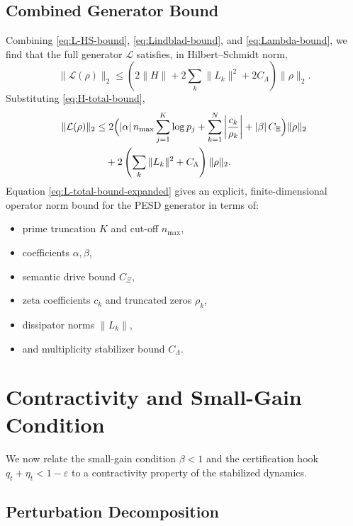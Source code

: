 \documentclass[11pt]{article}
\begin{document}
\subsection{Combined Generator Bound}

Combining \eqref{eq:L-HS-bound}, \eqref{eq:Lindblad-bound}, and \eqref{eq:Lambda-bound}, we find that the full generator \(\mathcal{L}\) satisfies, in Hilbert--Schmidt norm,
\begin{equation}
  \|\mathcal{L}(\rho)\|_2
  \le \left( 2\|H\|
           + 2\sum_k \|L_k\|^2
           + 2C_{\Lambda}
      \right)\|\rho\|_2.   \label{eq:L-total-bound}
\end{equation}
Substituting \eqref{eq:H-total-bound},
\begin{align}
  \|\mathcal{L}(\rho)\|_2
  &\le
    2\Bigl(
       |\alpha|\,n_{\max}\sum_{j=1}^K \log p_j
       + \sum_{k=1}^N \left|\frac{c_k}{\rho_k}\right|
       + |\beta|\,C_{\Xi}
    \Bigr)\|\rho\|_2 \nonumber \\
  &\quad + 2\left(\sum_k \|L_k\|^2 + C_{\Lambda}\right)\|\rho\|_2. \label{eq:L-total-bound-expanded}
\end{align}
Equation \eqref{eq:L-total-bound-expanded} gives an explicit, finite-dimensional operator norm bound for the PESD generator in terms of:
\begin{itemize}[nosep]
  \item prime truncation \(K\) and cut-off \(n_{\max}\),
  \item coefficients \(\alpha, \beta\),
  \item semantic drive bound \(C_{\Xi}\),
  \item zeta coefficients \(c_k\) and truncated zeros \(\rho_k\),
  \item dissipator norms \(\|L_k\|\),
  \item and multiplicity stabilizer bound \(C_{\Lambda}\).
\end{itemize}

\section{Contractivity and Small-Gain Condition}

We now relate the small-gain condition \(\beta < 1\) and the certification hook \(q_t + \eta_t < 1 - \varepsilon\) to a contractivity property of the stabilized dynamics.

\subsection{Perturbation Decomposition}
\end{document}
